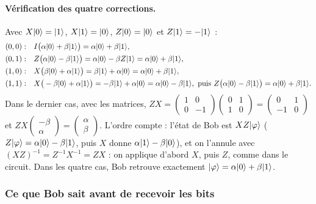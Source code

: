 \paragraph{Vérification des quatre corrections.} Avec $X|0\rangle=|1\rangle$, $X|1\rangle=|0\rangle$,
$Z|0\rangle=|0\rangle$ et $Z|1\rangle=-|1\rangle$ :
\begin{align*}
  (0,0):\quad & I\big(\alpha\ket{0}+\beta\ket{1}\big)=\alpha\ket{0}+\beta\ket{1},\\
  (0,1):\quad & Z\big(\alpha\ket{0}-\beta\ket{1}\big)=\alpha\ket{0}-\beta Z\ket{1}=\alpha\ket{0}+\beta\ket{1},\\
  (1,0):\quad & X\big(\beta\ket{0}+\alpha\ket{1}\big)=\beta\ket{1}+\alpha\ket{0}=\alpha\ket{0}+\beta\ket{1},\\
  (1,1):\quad & X\big(-\beta\ket{0}+\alpha\ket{1}\big)=-\beta\ket{1}+\alpha\ket{0}=\alpha\ket{0}-\beta\ket{1},
     \ \text{puis}\ Z\big(\alpha\ket{0}-\beta\ket{1}\big)=\alpha\ket{0}+\beta\ket{1}.
\end{align*}
Dans le dernier cas, avec les matrices,
$ZX=\begin{pmatrix}1&0\\0&-1\end{pmatrix}\begin{pmatrix}0&1\\1&0\end{pmatrix}
=\begin{pmatrix}0&1\\-1&0\end{pmatrix}$ et
$ZX\begin{pmatrix}-\beta\\ \alpha\end{pmatrix}=\begin{pmatrix}\alpha\\ \beta\end{pmatrix}$.
L'ordre compte : l'état de Bob est $XZ|\varphi\rangle$ ($Z|\varphi\rangle=\alpha|0\rangle-\beta|1\rangle$,
puis $X$ donne $\alpha|1\rangle-\beta|0\rangle$), et on l'annule avec
$(XZ)^{-1}=Z^{-1}X^{-1}=ZX$ : on applique d'abord $X$, puis $Z$, comme dans le circuit.
Dans les quatre cas, Bob retrouve exactement $|\varphi\rangle=\alpha|0\rangle+\beta|1\rangle$.

\subsubsection{Ce que Bob sait avant de recevoir les bits}

